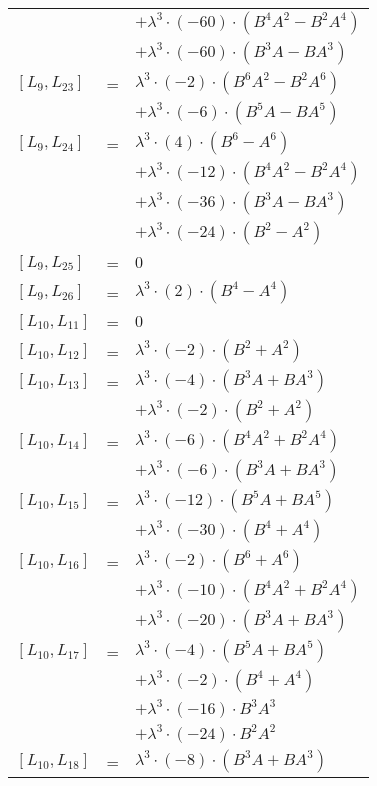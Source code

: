 \documentclass{article}
\begin{document}
\begin{center}
\begin{longtable}{lll}
 & & $ + {\lambda}^3{\cdot}(-60){\cdot}(B^{4}A^{2}-B^{2}A^{4})$ \\*
 & & $ + {\lambda}^3{\cdot}(-60){\cdot}(B^{3}A-BA^{3})$ \\
$[L_{9},L_{23}]$ & = & ${\lambda}^3{\cdot}(-2){\cdot}(B^{6}A^{2}-B^{2}A^{6})$ \\*
 & & $ + {\lambda}^3{\cdot}(-6){\cdot}(B^{5}A-BA^{5})$ \\
$[L_{9},L_{24}]$ & = & ${\lambda}^3{\cdot}(4){\cdot}(B^{6}-A^{6})$ \\*
 & & $ + {\lambda}^3{\cdot}(-12){\cdot}(B^{4}A^{2}-B^{2}A^{4})$ \\*
 & & $ + {\lambda}^3{\cdot}(-36){\cdot}(B^{3}A-BA^{3})$ \\*
 & & $ + {\lambda}^3{\cdot}(-24){\cdot}(B^{2}-A^{2})$ \\
$[L_{9},L_{25}]$ & = & $ 0 $ \\
$[L_{9},L_{26}]$ & = & ${\lambda}^3{\cdot}(2){\cdot}(B^{4}-A^{4})$ \\
$[L_{10},L_{11}]$ & = & $ 0 $ \\
$[L_{10},L_{12}]$ & = & ${\lambda}^3{\cdot}(-2){\cdot}(B^{2}+A^{2})$ \\
$[L_{10},L_{13}]$ & = & ${\lambda}^3{\cdot}(-4){\cdot}(B^{3}A+BA^{3})$ \\*
 & & $ + {\lambda}^3{\cdot}(-2){\cdot}(B^{2}+A^{2})$ \\
$[L_{10},L_{14}]$ & = & ${\lambda}^3{\cdot}(-6){\cdot}(B^{4}A^{2}+B^{2}A^{4})$ \\*
 & & $ + {\lambda}^3{\cdot}(-6){\cdot}(B^{3}A+BA^{3})$ \\
$[L_{10},L_{15}]$ & = & ${\lambda}^3{\cdot}(-12){\cdot}(B^{5}A+BA^{5})$ \\*
 & & $ + {\lambda}^3{\cdot}(-30){\cdot}(B^{4}+A^{4})$ \\
$[L_{10},L_{16}]$ & = & ${\lambda}^3{\cdot}(-2){\cdot}(B^{6}+A^{6})$ \\*
 & & $ + {\lambda}^3{\cdot}(-10){\cdot}(B^{4}A^{2}+B^{2}A^{4})$ \\*
 & & $ + {\lambda}^3{\cdot}(-20){\cdot}(B^{3}A+BA^{3})$ \\
$[L_{10},L_{17}]$ & = & ${\lambda}^3{\cdot}(-4){\cdot}(B^{5}A+BA^{5})$ \\*
 & & $ + {\lambda}^3{\cdot}(-2){\cdot}(B^{4}+A^{4})$ \\*
 & & $ + {\lambda}^3{\cdot}(-16){\cdot}B^{3}A^{3}$ \\*
 & & $ + {\lambda}^3{\cdot}(-24){\cdot}B^{2}A^{2}$ \\
$[L_{10},L_{18}]$ & = & ${\lambda}^3{\cdot}(-8){\cdot}(B^{3}A+BA^{3})$ \\*

\end{longtable}
\end{center}
\end{document}
